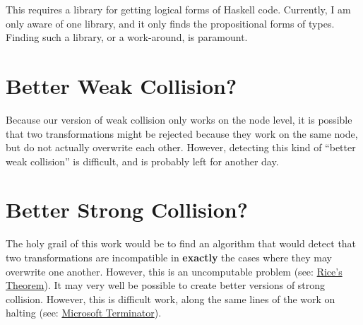 \documentclass[11pt]{article}
\begin{document}
This requires a library for getting logical forms of Haskell code. Currently, I am only aware of one library, and it only finds the propositional forms of types. Finding such a library, or a work-around, is paramount.
\section{Better Weak Collision?}
\label{sec-4}


Because our version of weak collision only works on the node level, it is possible that two transformations might be rejected because they work on the same node, but do not actually overwrite each other. However, detecting this kind of ``better weak collision'' is difficult, and is probably left for another day.
\section{Better Strong Collision?}
\label{sec-5}


The holy grail of this work would be to find an algorithm that would detect that two transformations are incompatible in \textbf{exactly} the cases where they may overwrite one another. However, this is an uncomputable problem (see: \href{http://en.wikipedia.org/wiki/Rice's_theorem}{Rice's Theorem}). It may very well be possible to create better versions of strong collision. However, this is difficult work, along the same lines of the work on halting (see: \href{http://research.microsoft.com/en-us/um/cambridge/projects/terminator/}{Microsoft Terminator}).
\end{document}
